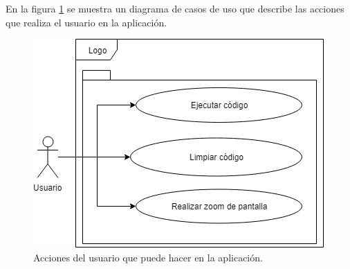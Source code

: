 En la figura \ref{fig:diagram:use_cases} se muestra un diagrama de casos de uso que describe las acciones que
realiza el usuario en la aplicación.

\begin{figure}[H]
	\begin{center}
		\includegraphics[scale=.8]{images/casos_de_uso/img_UseCase_Logo}
		\caption{Acciones del usuario que puede hacer en la aplicación.}
		\label{fig:diagram:use_cases}
	\end{center}
\end{figure}